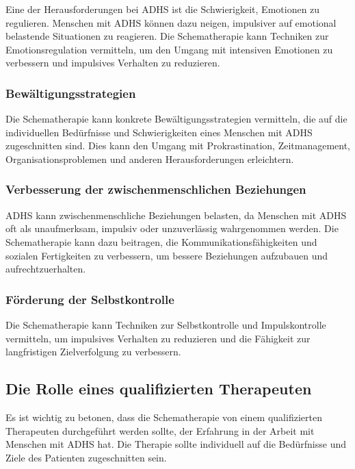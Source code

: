 Eine der Herausforderungen bei ADHS ist die Schwierigkeit, Emotionen zu regulieren. Menschen mit ADHS können dazu neigen, impulsiver auf emotional belastende Situationen zu reagieren. Die Schematherapie kann Techniken zur Emotionsregulation vermitteln, um den Umgang mit intensiven Emotionen zu verbessern und impulsives Verhalten zu reduzieren.

\subsubsection{Bewältigungsstrategien}

Die Schematherapie kann konkrete Bewältigungsstrategien vermitteln, die auf die individuellen Bedürfnisse und Schwierigkeiten eines Menschen mit ADHS zugeschnitten sind. Dies kann den Umgang mit Prokrastination, Zeitmanagement, Organisationsproblemen und anderen Herausforderungen erleichtern.

\subsubsection{Verbesserung der zwischenmenschlichen Beziehungen}

ADHS kann zwischenmenschliche Beziehungen belasten, da Menschen mit ADHS oft als unaufmerksam, impulsiv oder unzuverlässig wahrgenommen werden. Die Schematherapie kann dazu beitragen, die Kommunikationsfähigkeiten und sozialen Fertigkeiten zu verbessern, um bessere Beziehungen aufzubauen und aufrechtzuerhalten.

\subsubsection{Förderung der Selbstkontrolle}

Die Schematherapie kann Techniken zur Selbstkontrolle und Impulskontrolle vermitteln, um impulsives Verhalten zu reduzieren und die Fähigkeit zur langfristigen Zielverfolgung zu verbessern.

\subsection{Die Rolle eines qualifizierten Therapeuten}

Es ist wichtig zu betonen, dass die Schematherapie von einem qualifizierten Therapeuten durchgeführt werden sollte, der Erfahrung in der Arbeit mit Menschen mit ADHS hat. Die Therapie sollte individuell auf die Bedürfnisse und Ziele des Patienten zugeschnitten sein.

